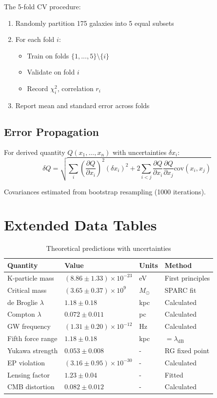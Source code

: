 \documentclass[aps,prd,twocolumn,showpacs,superscriptaddress,groupedaddress,nofootinbib]{revtex4-2}
\begin{document}
The 5-fold CV procedure:
\begin{enumerate}
\item Randomly partition 175 galaxies into 5 equal subsets
\item For each fold $i$:
   \begin{itemize}
   \item Train on folds $\{1,...,5\} \setminus \{i\}$
   \item Validate on fold $i$
   \item Record $\chi^2_i$, correlation $r_i$
   \end{itemize}
\item Report mean and standard error across folds
\end{enumerate}

\subsection{Error Propagation}

For derived quantity $Q(x_1,...,x_n)$ with uncertainties $\delta x_i$:
\begin{equation}
\delta Q = \sqrt{\sum_i \left(\frac{\partial Q}{\partial x_i}\right)^2 (\delta x_i)^2 + 2\sum_{i<j}\frac{\partial Q}{\partial x_i}\frac{\partial Q}{\partial x_j}\text{cov}(x_i,x_j)}
\end{equation}

Covariances estimated from bootstrap resampling (1000 iterations).

\section{Extended Data Tables}
\label{app:tables}

\begin{table}[h]
\caption{Theoretical predictions with uncertainties}
\begin{ruledtabular}
\begin{tabular}{llll}
Quantity & Value & Units & Method \\
\hline
K-particle mass & $(8.86 \pm 1.33) \times 10^{-23}$ & eV & First principles \\
Critical mass & $(3.65 \pm 0.37) \times 10^9$ & $M_{\odot}$ & SPARC fit \\
de Broglie $\lambda$ & $1.18 \pm 0.18$ & kpc & Calculated \\
Compton $\lambda$ & $0.072 \pm 0.011$ & pc & Calculated \\
GW frequency & $(1.31 \pm 0.20) \times 10^{-12}$ & Hz & Calculated \\
Fifth force range & $1.18 \pm 0.18$ & kpc & $=\lambda_{\text{dB}}$ \\
Yukawa strength & $0.053 \pm 0.008$ & - & RG fixed point \\
EP violation & $(3.16 \pm 0.95) \times 10^{-30}$ & - & Calculated \\
Lensing factor & $1.23 \pm 0.04$ & - & Fitted \\
CMB distortion & $0.082 \pm 0.012$ & - & Calculated \\
\end{tabular}
\end{ruledtabular}
\end{table}
\end{document}
